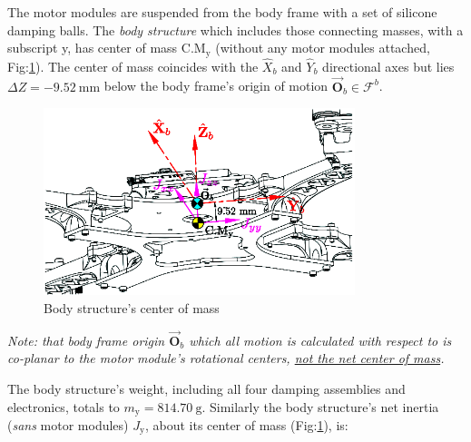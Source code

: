 \par
The motor modules are suspended from the body frame with a set of silicone damping balls. The \emph{body structure} which includes those connecting masses, with a subscript y, has center of mass $\text{C.M}_{\text{y}}$ (without any motor modules attached, Fig:\ref{fig:inertia-center}). The center of mass coincides with the $\hat{X}_b$ and $\hat{Y}_b$ directional axes but lies $\Delta Z=-9.52~\text{mm}$ below the body frame's origin of motion $\vec{\mathbf{O}}_b\in\mathcal{F}^b$.
\par
\begin{figure}[hbtp]
\vspace{-8pt}
\centering
\includegraphics[width=0.81\textwidth]{figs/inertia-center}
\caption{Body structure's center of mass}
\label{fig:inertia-center}
\vspace{-6pt}
\end{figure}
\par
\emph{\color{Gray}Note: that body frame origin $\vec{\mathbf{O}}_b$ which all motion is calculated with respect to is co-planar to the motor module's rotational centers, \underline{not the net center of mass}.}
\par
The body structure's weight, including all four damping assemblies and electronics, totals to $m_\text{y}=814.70~\text{g}$. Similarly the body structure's net inertia (\emph{sans} motor modules) $J_\text{y}$, about its center of mass (Fig:\ref{fig:inertia-center}), is:
